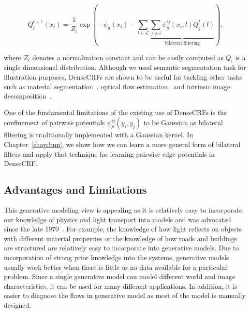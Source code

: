 \begin{equation}
Q^{t+1}_i(x_i) = \frac{1}{Z_i} \exp(-\psi_u(x_i) - \sum_{l \in \mathcal{L}}\underbrace{\sum_{j \ne i}
\psi^{ij}_p(x_i,l) Q^{t}_j(l)}_\text{bilateral filtering}),
\label{eq:mfupdate}
\end{equation}

where $Z_i$ denotes a normalization constant and can be easily computed as $Q_i$ is
a single dimensional distribution. Although we used semantic segmentation task
for illustration purposes, DenseCRFs are shown to be useful for tackling
other tasks such as material segmentation~\cite{bell2015minc}, optical flow
estimation~\cite{sun2013fully} and intrinsic image decomposition~\cite{bell2014intrinsic}.

One of the fundamental limitations of the existing use of DenseCRFs is the
confinement of pairwise potentials $\psi^{ij}_p(y_i,y_j)$ to be Gaussian as
bilateral filtering is traditionally implemented with a Gaussian kernel. In Chapter~\ref{chap:bnn},
we show how we can learn a more general form of bilateral filters and
apply that technique for learning pairwise edge potentials in DenseCRF.

\subsection{Advantages and Limitations}
\label{sec:gen-adv-limits}

This generative modeling view is appealing as it is relatively easy to incorporate our knowledge
of physics and light transport into models and was advocated since the late
1970~\cite{horn1977imageintensities,
grenander1976patterntheory,zhu1997learning,mumford2010patterntheory,
mansinghka2013approximate,yuille2006vision}.
For example, the knowledge of how light reflects on objects with different
material properties or the knowledge of how roads and buildings are structured
are relatively easy to incorporate into generative models.
Due to incorporation of strong prior knowledge into the systems, generative
models usually work better when there is little or no data available for a
particular problem.
Since a single generative model can model different world and image
characteristics, it can be used for many different applications.
In addition, it is easier to diagnose the flaws in generative model as most
of the model is manually designed.

